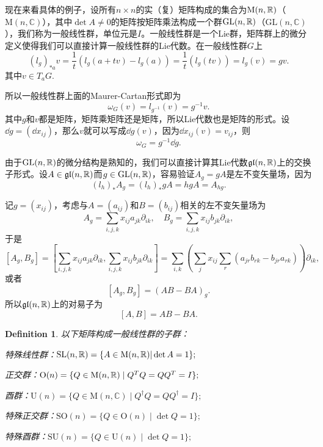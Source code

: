 \documentclass[8pt]{book}
\theoremstyle{plain}
\newtheorem{defi}{Definition}
\newcommand{\cc}{\mathbb{C}}
\begin{document}
现在来看具体的例子，设所有$n\times n$的实（复）矩阵构成的集合为$\mathrm{M}(n,\mathbb{R})$（$\mathrm{M}(n,\cc)$），其中$\det A\neq 0$的矩阵按矩阵乘法构成一个群$\mathrm{GL}(n,\mathbb{R})$（$\mathrm{GL}(n,\cc)$），我们称为一般线性群，单位元是$I$。一般线性群是一个Lie群，矩阵群上的微分定义使得我们可以直接计算一般线性群的Lie代数。在一般线性群$G$上
\[
	(l_g)_{*a}v=\frac{1}{t}(l_g(a+tv)-l_g(a))
	=\frac{1}{t}(l_g(tv))=l_g(v)=gv.
\]
其中$v\in T_aG$.

所以一般线性群上面的Maurer-Cartan形式即为
\[
	\omega_G(v)=l_{g^{-1}}(v)=g^{-1}v.
\]
其中$g$和$v$都是矩阵，矩阵乘矩阵还是矩阵，所以Lie代数也是矩阵的形式。设$\dd g=(\dd x_{ij})$，那么$v$就可以写成$\dd g(v)$，因为$\dd x_{ij}(v)=v_{ij}$，则
\[
	\omega_G=g^{-1}\dd g.
\]

由于$\mathrm{GL}(n,\mathbb{R})$的微分结构是熟知的，我们可以直接计算其Lie代数$\mathfrak{gl}(n,\mathbb{R})$上的交换子形式。设$A\in\mathfrak{gl}(n,\mathbb{R})$而$g\in\mathrm{GL}(n,\mathbb{R})$，容易验证$A_g=gA$是左不变矢量场，因为
\[
	(l_h)_{*}A_g=(l_h)_{*}gA=hgA=A_{hg}.
\]

记$g=(x_{ij})$，考虑与$A=(a_{ij})$和$B=(b_{ij})$相关的左不变矢量场为
\[
A_g=\sum_{i,j,k}x_{ij}a_{jk}\partial_{ik},\quad B_g=\sum_{i,j,k}x_{ij}b_{jk}\partial_{ik},
\]
于是
\[
[A_g,B_g]=\left[\sum_{i,j,k}x_{ij}a_{jk}\partial_{ik},\sum_{i,j,k}x_{ij}b_{jk}\partial_{ik}\right]=\sum_{i,k}\left(\sum_{j}x_{ij}\sum_{r}(a_{jr}b_{rk}-b_{jr}a_{rk})\right)\partial_{ik},
\]
或者
\[
[A_g,B_g]=(AB-BA)_g.
\]
所以$\mathfrak{gl}(n,\mathbb{R})$上的对易子为
\[
[A,B]=AB-BA.
\]

\begin{defi}以下矩阵构成一般线性群的子群：

 特殊线性群：$\mathrm{SL}(n,\mathbb{R})=\{A\in \mathrm{M}(n,\mathbb{R})|\det A=1\};$

 正交群：$\mathrm{O}(n) = \{ Q \in \mathrm{M}(n,\mathbb{R}) \mid Q^T Q = Q Q^T = I \};$

 酉群：$\mathrm{U}(n) = \{ Q \in \mathrm{M}(n,\cc) \mid Q^\dag Q = Q Q^\dag = I \};$

 特殊正交群：$\mathrm{SO}(n) =\{ Q \in \mathrm{O}(n) \mid \det Q=1 \};$

 特殊酉群：$\mathrm{SU}(n) =\{ Q \in \mathrm{U}(n) \mid \det Q=1 \};$
\end{defi}
\end{document}
